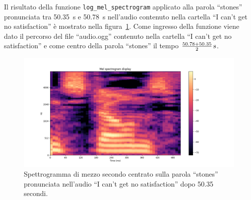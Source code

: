 \documentclass[12pt,a4paper,titlepage]{article}
\begin{document}
Il risultato della funzione \texttt{log\_mel\_spectrogram} applicato alla parola ``stones'' pronunciata tra \SI{50.35}{\second} e \SI{50.78}{\second} nell'audio contenuto nella cartella ``I can't get no satisfaction'' è mostrato nella figura~\ref{fig:stones_spec}. Come ingresso della funzione viene dato il percorso del file ``audio.ogg'' contenuto nella cartella ``I can't get no satisfaction'' e come centro della parola ``stones'' il tempo $\SI[parse-numbers=false]{\frac{50.78 + 50.35}{2}}{\second}$.

\begin{figure}[h]
	\centering	
	\includegraphics[width=1\textwidth]{../Stones_spectrogram}
	\caption{Spettrogramma di mezzo secondo centrato sulla parola ``stones'' pronunciata nell'audio ``I can't get no satisfaction'' dopo 50.35 secondi.}
	\label{fig:stones_spec}
\end{figure}
\end{document}
